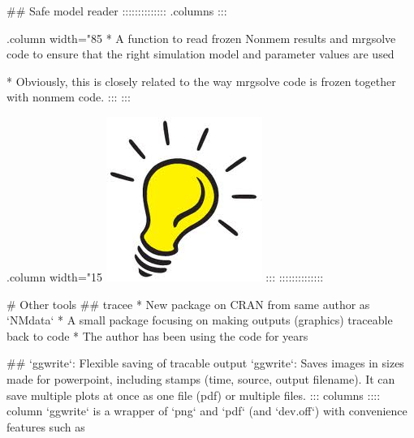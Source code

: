 {{{{{{{{## Safe model reader
:::::::::::::: {.columns}
::: {.column width="85%
* A function to read frozen Nonmem results and mrgsolve code to ensure that the right simulation model and parameter values are used

* Obviously, this is closely related to the way mrgsolve code is frozen together with nonmem code.
::: 
::: {.column width="15%
\includegraphics[width=.5in]{figures/ideabulb.jpg}
::: 
::::::::::::::


# Other tools
## tracee
* New package on CRAN from same author as `NMdata`
* A small package focusing on making outputs (graphics) traceable back to code
* The author has been using the code for years



## `ggwrite`: Flexible saving of tracable output
`ggwrite`: Saves images in sizes made for powerpoint, including stamps (time, source, output filename). It can save multiple plots at once as one file (pdf) or multiple files. 
::: columns
:::: column
`ggwrite` is a wrapper of `png` and `pdf` (and `dev.off`) with convenience features such as

}}}}}}}}}}
